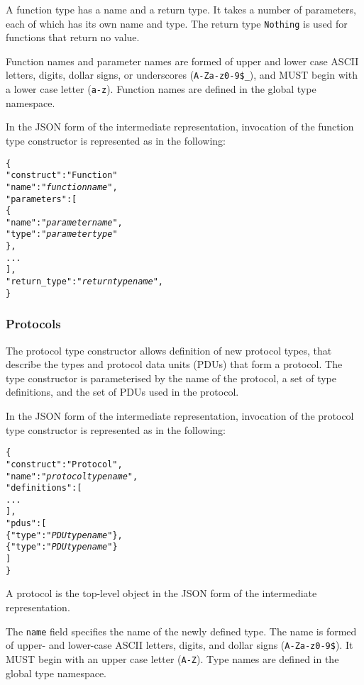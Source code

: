 \documentclass[10pt,twocolumn,a4paper]{article}
\newcommand{\code}[1]{\texttt{#1}}
\begin{document}
A function type has a name and a return type. It takes a number of
parameters, each of which has its own name and type. The return type
\code{Nothing} is used for functions that return no value.

Function names and parameter names are formed of upper and lower case ASCII
letters, digits, dollar signs, or underscores (\code{A-Za-z0-9\$\_}), and
MUST begin with a lower case letter (\code{a-z}).
Function names are defined in the global type namespace.

In the JSON form of the intermediate representation, invocation of the
function type constructor is represented as in the following:
\footnotesize
\begin{alltt}
  \{
    "construct"    : "Function"
    "name"         : "\emph{function name}",
    "parameters"   : [
      \{
        "name" : "\emph{parameter name}",
        "type" : "\emph{parameter type}"
      \},
      ...
    ],
    "return\_type"  : "\emph{return type name}",
  \}
\end{alltt}
\normalsize

\subsubsection{Protocols}

The protocol type constructor allows definition of new protocol types, that
describe the types and protocol data units (PDUs) that form a protocol. The
type constructor is parameterised by the name of the protocol, a set of
type definitions, and the set of PDUs used in the protocol.

In the JSON form of the intermediate representation, invocation of the
protocol type constructor is represented as in the following:
\footnotesize
\begin{alltt}
  \{
    "construct"   : "Protocol",
    "name"        : "\emph{protocol type name}",
    "definitions" : [
                      ...
                    ],
    "pdus"        : [
      \{"type" : "\emph{PDU type name}"\},
      \{"type" : "\emph{PDU type name}"\}
    ]
  \}
\end{alltt}
\normalsize
A protocol is the top-level object in the JSON form of the intermediate
representation.

The \code{name} field specifies the name of the newly defined type. The
name is formed of upper- and lower-case ASCII letters, digits, and dollar
signs (\code{A-Za-z0-9\$}).  It MUST begin with an upper case letter
(\code{A-Z}). Type names are defined in the global type namespace.
\end{document}
